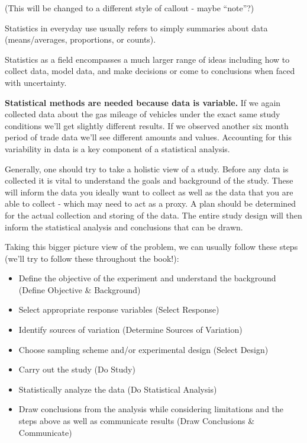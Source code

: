 \documentclass[
]{book}
\providecommand{\tightlist}{%
  \setlength{\itemsep}{0pt}\setlength{\parskip}{0pt}}
\theoremstyle{definition}
\theoremstyle{definition}
\theoremstyle{definition}
\theoremstyle{remark}
\let\BeginKnitrBlock\begin \let\EndKnitrBlock\end
\begin{document}
\BeginKnitrBlock{definition}
(This will be changed to a different style of callout - maybe ``note''?)

Statistics in everyday use usually refers to simply summaries about data (means/averages, proportions, or counts).

Statistics as a field encompasses a much larger range of ideas including how to collect data, model data, and make decisions or come to conclusions when faced with uncertainty.
\EndKnitrBlock{definition}

\textbf{Statistical methods are needed because data is variable.} If we again collected data about the gas mileage of vehicles under the exact same study conditions we'll get slightly different results. If we observed another six month period of trade data we'll see different amounts and values. Accounting for this variability in data is a key component of a statistical analysis.

Generally, one should try to take a holistic view of a study. Before any data is collected it is vital to understand the goals and background of the study. These will inform the data you ideally want to collect as well as the data that you are able to collect - which may need to act as a proxy. A plan should be determined for the actual collection and storing of the data. The entire study design will then inform the statistical analysis and conclusions that can be drawn.

Taking this bigger picture view of the problem, we can usually follow these steps (we'll try to follow these throughout the book!):

\begin{itemize}
\tightlist
\item
  Define the objective of the experiment and understand the background (Define Objective \& Background)\\
\item
  Select appropriate response variables (Select Response)\\
\item
  Identify sources of variation (Determine Sources of Variation)\\
\item
  Choose sampling scheme and/or experimental design (Select Design)\\
\item
  Carry out the study (Do Study)
\item
  Statistically analyze the data (Do Statistical Analysis)\\
\item
  Draw conclusions from the analysis while considering limitations and the steps above as well as communicate results (Draw Conclusions \& Communicate)
\end{itemize}
\end{document}
